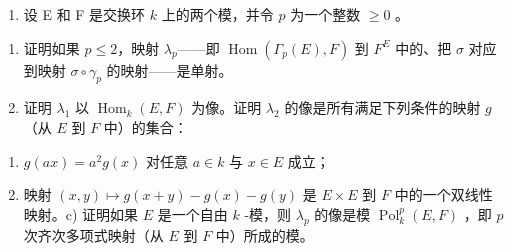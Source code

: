 \begin{enumerate}
\def\labelenumi{\arabic{enumi})}
\setcounter{enumi}{15}
\tightlist
\item
  设 E 和 F 是交换环 \(k\) 上的两个模，并令 \(p\) 为一个整数 \(\geqslant 0\) 。
\end{enumerate}

\begin{enumerate}
\def\labelenumi{\alph{enumi})}
\item
  证明如果 \(p \leqslant 2\)，映射 \(\lambda_p\)——即 \(\operatorname{Hom}(\Gamma_p(E), F)\) 到 \(F^E\) 中的、把 \(\sigma\) 对应到映射 \(\sigma \circ \gamma_p\) 的映射——是单射。
\item
  证明 \(\lambda_1\) 以 \(\operatorname{Hom}_k(E, F)\) 为像。证明 \(\lambda_2\) 的像是所有满足下列条件的映射 \(g\) （从 \(E\) 到 \(F\) 中）的集合：
\end{enumerate}

\begin{enumerate}
\def\labelenumi{(\roman{enumi})}
\item
  \(g(ax) = a^2 g(x)\) 对任意 \(a \in k\) 与 \(x \in E\) 成立；
\item
  映射 \((x, y) \mapsto g(x + y) - g(x) - g(y)\) 是 \(E \times E\) 到 \(F\) 中的一个双线性映射。c) 证明如果 \(E\) 是一个自由 \(k\) -模，则 \(\lambda_p\) 的像是模 \(\operatorname{Pol}_k^p(E, F)\) ，即 \(p\) 次齐次多项式映射（从 \(E\) 到 \(F\) 中）所成的模。
\end{enumerate}

